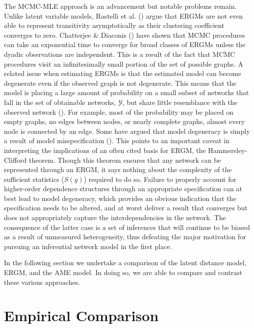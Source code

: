 \documentclass[12pt,pdflatex]{elsarticle}
\begin{document}
The MCMC-MLE approach is an advancement but notable problems remain. Unlike latent variable models, Rastelli et al. (\citealt{rastelli:etal:2016}) argue that ERGMs are not even able to represent transitivity asymptotically as their clustering coefficient converges to zero. Chatterjee \& Diaconis (\citealt{chatterjee:diaconis:2013}) have shown that MCMC procedures can take an exponential time to converge for broad classes of ERGMs unless the dyadic observations are independent. This is a result of the fact that MCMC procedures visit an infinitesimally small portion of the set of possible graphs. A related issue when estimating ERGMs is that the estimated model can become degenerate even if the observed graph is not degenerate. This means that the model is placing a large amount of probability on a small subset of networks that fall in the set of obtainable networks, $\mathcal{Y}$, but share little resemblance with the observed network (\citealt{schweinberger:2011}). For example, most of the probability may be placed on empty graphs, no edges between nodes, or nearly complete graphs, almost every node is connected by an edge. Some have argued that model degeneracy is simply a result of model misspecification (\citealt{goodreau:etal:2008,handcock:etal:2008}). This points to an important caveat in interpreting the implications of an often cited basis for ERGM, the Hammersley-Clifford theorem. Though this theorem ensures that any network can be represented through an ERGM, it says nothing about the complexity of the sufficient statistics ($S(y)$) required to do so. Failure to properly account for higher-order dependence structures through an appropriate specification can at best lead to model degeneracy, which provides an obvious indication that the specification needs to be altered, and at worst deliver a result that converges but does not appropriately capture the interdependencies in the network. The consequence of the latter case is a set of inferences that will continue to be biased as a result of unmeasured heterogeneity, thus defeating the major motivation for pursuing an inferential network model in the first place. 

In the following section we undertake a comparison of the latent distance model, ERGM, and the AME model. In doing so, we are able to compare and contrast these various approaches.

\section*{\textbf{Empirical Comparison}}
\end{document}
